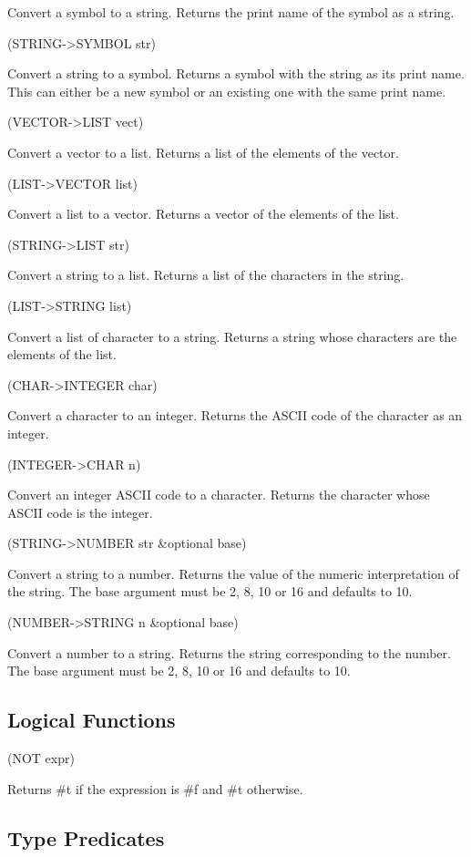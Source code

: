 \documentclass[11pt]{article}
\begin{document}
Convert a symbol to a string. Returns the print name of the symbol as a
string.

(STRING->SYMBOL str)

Convert a string to a symbol. Returns a symbol with the string as its
print name. This can either be a new symbol or an existing one with the
same print name.

(VECTOR->LIST vect)

Convert a vector to a list. Returns a list of the elements of the
vector.

(LIST->VECTOR list)

Convert a list to a vector. Returns a vector of the elements of the
list.

(STRING->LIST str)

Convert a string to a list. Returns a list of the characters in the
string.

(LIST->STRING list)

Convert a list of character to a string. Returns a string whose
characters are the elements of the list.

(CHAR->INTEGER char)

Convert a character to an integer. Returns the ASCII code of the
character as an integer.

(INTEGER->CHAR n)

Convert an integer ASCII code to a character. Returns the character
whose ASCII code is the integer.

(STRING->NUMBER str \&optional base)

Convert a string to a number.  Returns the value of the numeric
interpretation of the string.  The base argument must be 2, 8, 10 or 16
and defaults to 10.

(NUMBER->STRING n \&optional base)

Convert a number to a string.  Returns the string corresponding to the
number.  The base argument must be 2, 8, 10 or 16 and defaults to 10.
\subsection{Logical Functions}
\label{sec-1-24}

(NOT expr)

Returns \#t if the expression is \#f and \#t otherwise.
\subsection{Type Predicates}
\label{sec-1-25}
\end{document}
